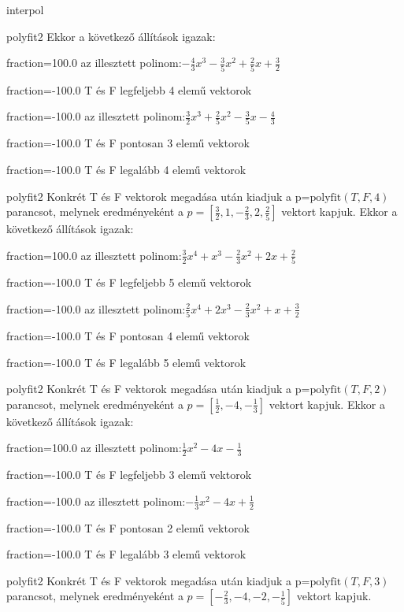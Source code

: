 \documentclass[12pt]{article}
\begin{document}
\begin{quiz}{interpol}
\begin{multi}[multiple]{polyfit2}
Ekkor a következő állítások igazak:
\item[fraction=100.0] az illesztett polinom:$-\frac{4}{3}x^3-\frac{3}{5}x^2+\frac{2}{5}x+\frac{3}{2}$
\item[fraction=-100.0]  T és F legfeljebb 4 elemű vektorok
\item[fraction=-100.0]  az illesztett polinom:$\frac{3}{2}x^3+\frac{2}{5}x^2-\frac{3}{5}x-\frac{4}{3}$
\item[fraction=-100.0]  T és F pontosan 3 elemű vektorok
\item[fraction=-100.0] T és F legalább 4 elemű vektorok
\end{multi}
\begin{multi}[multiple]{polyfit2}
Konkrét T és F vektorok megadása után kiadjuk a p=$\mathrm{polyfit}(T,F,4)$
parancsot, melynek eredményeként a $p=\left[\frac{3}{2},1,-\frac{2}{3},2,\frac{2}{5}\right]$ vektort kapjuk.
Ekkor a következő állítások igazak:
\item[fraction=100.0] az illesztett polinom:$\frac{3}{2}x^4+x^3-\frac{2}{3}x^2+2x+\frac{2}{5}$
\item[fraction=-100.0]  T és F legfeljebb 5 elemű vektorok
\item[fraction=-100.0]  az illesztett polinom:$\frac{2}{5}x^4+2x^3-\frac{2}{3}x^2+x+\frac{3}{2}$
\item[fraction=-100.0]  T és F pontosan 4 elemű vektorok
\item[fraction=-100.0] T és F legalább 5 elemű vektorok
\end{multi}
\begin{multi}[multiple]{polyfit2}
Konkrét T és F vektorok megadása után kiadjuk a p=$\mathrm{polyfit}(T,F,2)$
parancsot, melynek eredményeként a $p=\left[\frac{1}{2},-4,-\frac{1}{3}\right]$ vektort kapjuk.
Ekkor a következő állítások igazak:
\item[fraction=100.0] az illesztett polinom:$\frac{1}{2}x^2-4x-\frac{1}{3}$
\item[fraction=-100.0]  T és F legfeljebb 3 elemű vektorok
\item[fraction=-100.0]  az illesztett polinom:$-\frac{1}{3}x^2-4x+\frac{1}{2}$
\item[fraction=-100.0]  T és F pontosan 2 elemű vektorok
\item[fraction=-100.0] T és F legalább 3 elemű vektorok
\end{multi}
\begin{multi}[multiple]{polyfit2}
Konkrét T és F vektorok megadása után kiadjuk a p=$\mathrm{polyfit}(T,F,3)$
parancsot, melynek eredményeként a $p=\left[-\frac{2}{3},-4,-2,-\frac{1}{5}\right]$ vektort kapjuk.

\end{multi}
\end{quiz}
\end{document}
